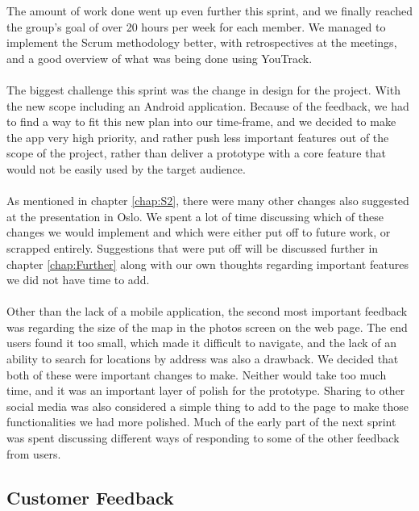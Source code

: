 The amount of work done went up even further this sprint, and we finally reached the group's goal of over 20 hours per week for each member. We managed to implement the Scrum methodology better, with retrospectives at the meetings, and a good overview of what was being done using YouTrack.

\paragraph{} The biggest challenge this sprint was the change in design for the project. With the new scope including an Android application. Because of the feedback, we had to find a way to fit this new plan into our time-frame, and we decided to make the app very high priority, and rather push less important features out of the scope of the project, rather than deliver a prototype with a core feature that would not be easily used by the target audience.

\paragraph{} As mentioned in chapter \ref{chap:S2}, there were many other changes also suggested at the presentation in Oslo. We spent a lot of time discussing which of these changes we would implement and which were either put off to future work, or scrapped entirely. Suggestions that were put off will be discussed further in chapter \ref{chap:Further} along with our own thoughts regarding important features we did not have time to add.

\paragraph{} Other than the lack of a mobile application, the second most important feedback was regarding the size of the map in the photos screen on the web page. The end users found it too small, which made it difficult to navigate, and the lack of an ability to search for locations by address was also a drawback. We decided that both of these were important changes to make. Neither would take too much time, and it was an important layer of polish for the prototype. Sharing to other social media was also considered a simple thing to add to the page to make those functionalities we had more polished. Much of the early part of the next sprint was spent discussing different ways of responding to some of the other feedback from users.

\subsection{Customer Feedback}
\label{subsec:S4RetrospectiveFeedback}


